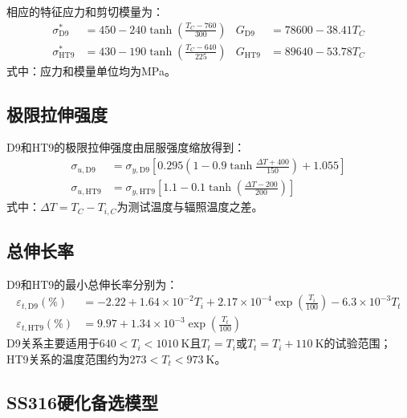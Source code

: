 相应的特征应力和剪切模量为：
\begin{equation}
	\label{eq:appendix_cladding_characteristic_stress}
	\begin{aligned}
		\sigma^*_{\mathrm{D9}}
		&=450-240\tanh\!\left(\frac{T_C-760}{300}\right)
		&
		G_{\mathrm{D9}}&=78600-38.41T_C\\
		\sigma^*_{\mathrm{HT9}}
		&=430-190\tanh\!\left(\frac{T_C-640}{225}\right)
		&
		G_{\mathrm{HT9}}&=89640-53.78T_C
	\end{aligned}
\end{equation}
\noindent 式中：应力和模量单位均为MPa。

\subsection{极限拉伸强度}

D9和HT9的极限拉伸强度由屈服强度缩放得到：
\begin{equation}
	\label{eq:appendix_d9_ht9_ultimate_strength}
	\begin{aligned}
		\sigma_{u,\mathrm{D9}}
		&=\sigma_{y,\mathrm{D9}}
		\left[
		0.295\left(1-0.9\tanh\frac{\Delta T+400}{150}\right)
		+1.055
		\right]\\
		\sigma_{u,\mathrm{HT9}}
		&=\sigma_{y,\mathrm{HT9}}
		\left[
		1.1-0.1\tanh\!\left(\frac{\Delta T-200}{200}\right)
		\right]
	\end{aligned}
\end{equation}
\noindent 式中：$\Delta T=T_C-T_{i,C}$为测试温度与辐照温度之差。

\subsection{总伸长率}

D9和HT9的最小总伸长率分别为：
\begin{equation}
	\label{eq:appendix_d9_ht9_total_elongation}
	\begin{aligned}
		\varepsilon_{t,\mathrm{D9}}(\%)
		&=-2.22+1.64\times10^{-2}T_i
		+2.17\times10^{-4}\exp\!\left(\frac{T_i}{100}\right)
		-6.3\times10^{-3}T_t\\
		\varepsilon_{t,\mathrm{HT9}}(\%)
		&=9.97+1.34\times10^{-3}
		\exp\!\left(\frac{T_t}{100}\right)
	\end{aligned}
\end{equation}
D9关系主要适用于$640<T_i<1010\ \mathrm{K}$且$T_t=T_i$或$T_t=T_i+110\ \mathrm{K}$的试验范围；HT9关系的温度范围约为$273<T_t<973\ \mathrm{K}$。

\subsection{SS316硬化备选模型}

